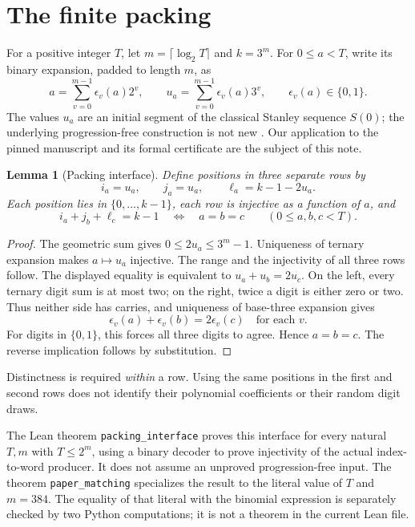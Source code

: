 \documentclass[11pt]{article}
\newtheorem{lemma}[theorem]{Lemma}
\begin{document}
\section{The finite packing}
For a positive integer \(T\), let \(m=\lceil\log_2 T\rceil\) and
\(k=3^m\). For \(0\le a<T\), write its binary expansion, padded to
length \(m\), as
\[
 a=\sum_{v=0}^{m-1}\epsilon_v(a)2^v,\qquad
 u_a=\sum_{v=0}^{m-1}\epsilon_v(a)3^v,\qquad
 \epsilon_v(a)\in\{0,1\}.
\]
The values \(u_a\) are an initial segment of the classical Stanley
sequence \(S(0)\); the underlying progression-free construction is
not new \cite{stanley}. Our application to the pinned manuscript
and its formal certificate are the subject of this note.

\begin{lemma}[Packing interface]\label{lem:packing}
Define positions in three separate rows by
\[
 i_a=u_a,\qquad j_a=u_a,\qquad \ell_a=k-1-2u_a.
\]
Each position lies in \(\{0,\ldots,k-1\}\), each row is injective
as a function of \(a\), and
\[
 i_a+j_b+\ell_c=k-1\quad\Longleftrightarrow\quad a=b=c
 \qquad (0\le a,b,c<T).
\]
\end{lemma}
\begin{proof}
The geometric sum gives \(0\le2u_a\le3^m-1\).
Uniqueness of ternary expansion makes \(a\mapsto u_a\) injective.
The range and the injectivity of all three rows follow.
The displayed equality is equivalent to \(u_a+u_b=2u_c\).
On the left, every ternary digit sum is at most two; on the right,
twice a digit is either zero or two. Thus neither side has carries,
and uniqueness of base-three expansion gives
\[
 \epsilon_v(a)+\epsilon_v(b)=2\epsilon_v(c)
 \quad\text{for each }v.
\]
For digits in \(\{0,1\}\), this forces all three digits to agree.
Hence \(a=b=c\). The reverse implication follows by substitution.
\end{proof}
Distinctness is required \emph{within} a row. Using the same positions
in the first and second rows does not identify their polynomial
coefficients or their random digit draws.

The Lean theorem \texttt{packing\_interface} proves this interface
for every natural \(T,m\) with \(T\le2^m\), using a binary decoder to
prove injectivity of the actual index-to-word producer. It does not
assume an unproved progression-free input. The theorem
\texttt{paper\_matching} specializes the result to the literal
value of \(T\) and \(m=384\). The equality of that literal with the
binomial expression is separately checked by two Python computations;
it is not a theorem in the current Lean file.
\end{document}
